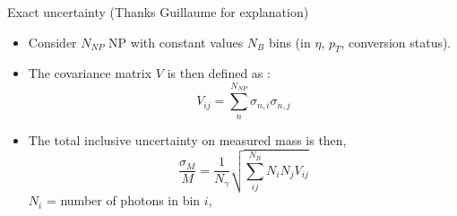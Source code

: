 \documentclass[a4paper]{beamer}
\begin{document}
\begin{frame}{Exact uncertainty}
  (Thanks Guillaume for explanation)
  \begin{itemize}
  \item Consider $N_{NP}$ NP with constant values $N_B$ bins (in $\eta$, $p_T$, conversion status).
  \item The covariance matrix $V$ is then defined as :
    \begin{equation}
      V_{ij} = \sum\limits_{n}^{N_{NP}} \sigma_{n,i}\sigma_{n,j}
    \end{equation}
  \item The total inclusive uncertainty on measured mass is then, 
    \begin{equation}
      \frac{\sigma_M}{M} = \frac{1}{N_\gamma}\sqrt{\sum\limits_{ij}^{N_B} N_iN_jV_{ij}}
    \end{equation}
    $N_i$ = number of photons in bin $i$,
    
  \end{itemize}
\end{frame}
\end{document}

